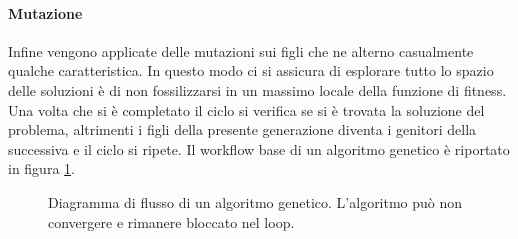 \documentclass[italian,twoside,twocolumn]{article}
\begin{document}
\paragraph{Mutazione} Infine vengono applicate delle mutazioni sui figli che ne alterno casualmente qualche caratteristica. In questo modo ci si assicura di esplorare tutto lo spazio delle soluzioni è di non fossilizzarsi in un massimo locale della funzione di fitness.
\\
Una volta che si è completato il ciclo si verifica se si è trovata la soluzione del problema, altrimenti i figli della presente generazione diventa i genitori della successiva e il ciclo si ripete. Il workflow base di un algoritmo genetico è riportato in figura \ref*{fig:workflow_genetic}. 
\begin{figure}[htbp]
	\centering
	\caption{Diagramma di flusso di un algoritmo genetico. L'algoritmo può non convergere e rimanere bloccato nel loop. }
	\label{fig:workflow_genetic}
\end{figure}
\end{document}
